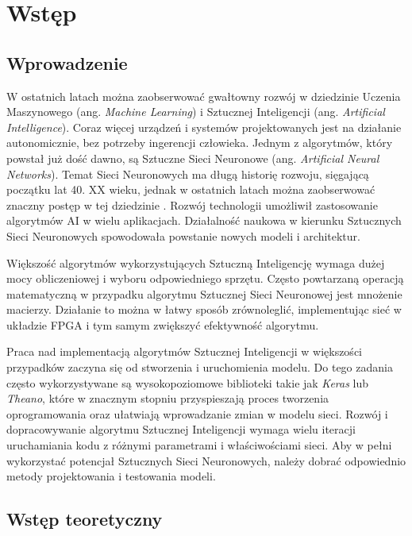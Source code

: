 \newpage %
\cleardoublepage %
\pagestyle{headings}
\section{Wstęp}

\subsection{Wprowadzenie}

W ostatnich latach można zaobserwować gwałtowny rozwój w dziedzinie 
Uczenia Maszynowego (ang. \emph{Machine Learning}) i Sztucznej Inteligencji 
(ang. \emph{Artificial Intelligence}). Coraz więcej urządzeń i systemów projektowanych jest na działanie autonomicznie, bez potrzeby ingerencji człowieka. 
Jednym z algorytmów, który powstał już dość dawno, są Sztuczne Sieci Neuronowe (ang. \emph{Artificial Neural Networks}). Temat Sieci Neuronowych ma długą historię rozwoju, sięgającą początku lat 40. XX wieku, jednak w ostatnich latach można zaobserwować znaczny postęp w tej dziedzinie \cite{Kriesel2007NeuralNetworks}. Rozwój technologii umożliwił zastosowanie algorytmów AI w wielu aplikacjach. Działalność naukowa w kierunku Sztucznych Sieci Neuronowych spowodowała powstanie nowych modeli i architektur.

Większość algorytmów wykorzystujących Sztuczną Inteligencję wymaga dużej mocy 
obliczeniowej i wyboru odpowiedniego sprzętu. Często powtarzaną operacją matematyczną 
w przypadku algorytmu Sztucznej Sieci Neuronowej jest mnożenie macierzy.
Działanie to można w łatwy sposób zrównoleglić, implementując sieć w układzie 
FPGA i tym samym zwiększyć efektywność algorytmu.

Praca nad implementacją algorytmów Sztucznej Inteligencji w większości 
przypadków zaczyna się od stworzenia i uruchomienia modelu. Do tego zadania 
często wykorzystywane są wysokopoziomowe biblioteki takie jak \emph{Keras} lub \emph{Theano}, które w znacznym stopniu przyspieszają proces tworzenia oprogramowania oraz ułatwiają wprowadzanie zmian w modelu sieci. Rozwój i dopracowywanie 
algorytmu Sztucznej Inteligencji wymaga wielu iteracji uruchamiania kodu 
z różnymi parametrami i właściwościami sieci. Aby w pełni wykorzystać potencjał Sztucznych Sieci Neuronowych, należy dobrać odpowiednio metody projektowania i testowania modeli.

\subsection{Wstęp teoretyczny}

